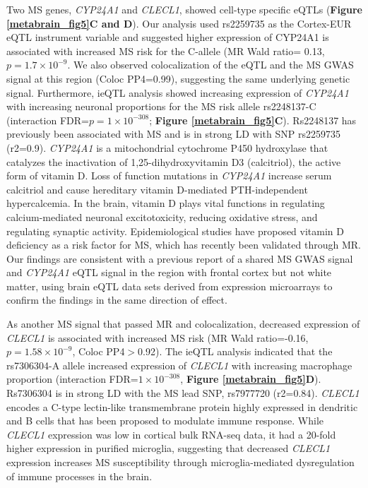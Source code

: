 Two MS genes, \emph{CYP24A1} and \emph{CLECL1}, showed cell-type specific eQTLs (\textbf{Figure \ref{metabrain_fig5}C and D}). Our analysis used rs2259735 as the Cortex-EUR eQTL instrument variable and suggested higher expression of CYP24A1 is associated with increased MS risk for the C-allele (MR Wald ratio= 0.13, $p=1.7 \times 10^{-9}$. We also observed colocalization of the eQTL and the MS GWAS signal at this region (Coloc PP4=0.99), suggesting the same underlying genetic signal. Furthermore, ieQTL analysis showed increasing expression of \emph{CYP24A1} with increasing neuronal proportions for the MS risk allele rs2248137-C (interaction FDR=$p=1 \times 10^{-308}$; \textbf{Figure \ref{metabrain_fig5}C}). Rs2248137 has previously been associated with MS\cite{consortiumMultipleSclerosisGenomic2019} and is in strong LD with SNP rs2259735 (r2=0.9). \emph{CYP24A1} is a mitochondrial cytochrome P450 hydroxylase that catalyzes the inactivation of 1,25-dihydroxyvitamin D3 (calcitriol), the active form of vitamin D\cite{jones25HydroxyvitaminD24hydroxylaseCYP24A12012}. Loss of function mutations in \emph{CYP24A1} increase serum calcitriol and cause hereditary vitamin D-mediated PTH-independent hypercalcemia\cite{schlingmannMutationsCYP24A1Idiopathic2011,cappellaniHereditaryHypercalcemiaCaused2019}. In the brain, vitamin D plays vital functions in regulating calcium-mediated neuronal excitotoxicity, reducing oxidative stress, and regulating synaptic activity\cite{mpandzouVitaminDeficiencyIts2016}. Epidemiological studies have proposed vitamin D deficiency as a risk factor for MS\cite{agnelloCYP27A1CYP24A1RXRalpha2018,pierrot-deseillignyHypovitaminosisOneEnvironmental2010}, which has recently been validated through MR\cite{rheadMendelianRandomizationShows2016,jacobsBMILowVitamin2020,jiangCausalRoleCirculating2021}.  Our findings are consistent with a previous report of a shared MS GWAS signal and \emph{CYP24A1} eQTL signal in the region with frontal cortex but not white matter, using brain eQTL data sets derived from expression microarrays to confirm the findings in the same direction of effect\cite{ramasamyGeneticEvidencePathogenic2014}.  

As another MS signal that passed MR and colocalization, decreased expression of \emph{CLECL1} is associated with increased MS risk (MR Wald ratio=-0.16, $p=1.58 \times 10^{-9}$, Coloc PP4$>$0.92). The ieQTL analysis indicated that the rs7306304-A allele increased expression of \emph{CLECL1} with increasing macrophage proportion (interaction FDR=$1 \times 10^{-308}$, \textbf{Figure \ref{metabrain_fig5}D}). Rs7306304 is in strong LD with the MS lead SNP, rs7977720 (r2=0.84)\cite{consortiumMultipleSclerosisGenomic2019}. \emph{CLECL1} encodes a C-type lectin-like transmembrane protein highly expressed in dendritic and B cells that has been proposed to modulate immune response\cite{vanluijnMultipleSclerosisassociatedCLEC16A2015}. While \emph{CLECL1} expression was low in cortical bulk RNA-seq data, it had a 20-fold higher expression in purified microglia\cite{consortiumMultipleSclerosisGenomic2019}, suggesting that decreased \emph{CLECL1} expression increases MS susceptibility through microglia-mediated dysregulation of immune processes in the brain. 

